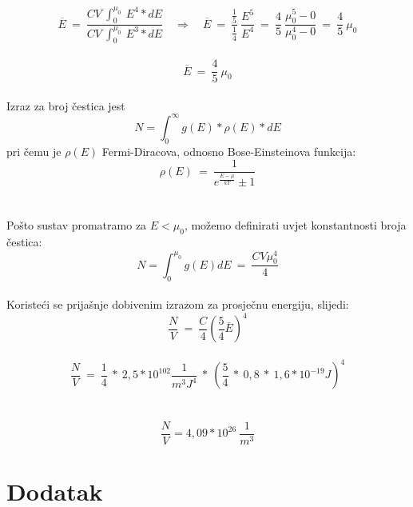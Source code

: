 \documentclass[a4paper,12pt]{article}
\begin{document}
\newpage
$$ \overline{E}\ =\ \frac{CV\ \int_{0}^{\mu_0}\ E^4*dE}{CV\ \int_{0}^{\mu_0}\ E^3*dE} \quad \Rightarrow \quad \overline{E}\ =\ \frac{\frac{1}{5}}{\frac{1}{4}}\ \frac{E^5}{E^4}
\ =\ \frac{4}{5}\ \frac{\mu_0^5-0}{\mu_0^4-0}\ =\ \frac{4}{5}\ \mu_0 $$
\\
$$ \overline{E}\ =\ \frac{4}{5}\ \mu_0 $$
\\
Izraz za broj \v{c}estica jest
$$ N = \int_{0}^{\infty}g(E)*\rho(E)*dE $$
pri \v{c}emu je $\rho(E)$ Fermi-Diracova, odnosno Bose-Einsteinova funkcija:
$$ \rho(E)\ =\ \frac{1}{e^{\frac{E-\mu}{kT}} \pm 1} $$
\\
\\
Po\v{s}to sustav promatramo za $E<\mu_0$, mo\v{z}emo definirati uvjet konstantnosti broja \v{c}estica:
\\
$$ N = \int_{0}^{\mu_0}g(E)dE\ =\ \frac{CV \mu_0^{4}}{4} $$
\\
Koriste\'ci se prija\v{s}nje dobivenim izrazom za prosje\v{c}nu energiju, slijedi:
\\
$$ \frac{N}{V}\ =\ \frac{C}{4} \left( \frac{5}{4} \overline{E} \right)^4 $$
\\
$$ \frac{N}{V}\ =\ \frac{1}{4}\ *\ 2,5*10^{102} \frac{1}{m^3 J^4}\ *\ \left( \frac{5}{4}\ *\ 0,8\ *\ 1,6*10^{-19}J \right)^4 $$
\\
\\
$$ \frac{N}{V} = 4,09*10^{26}\ \frac{1}{m^3} $$

\newpage
\section{Dodatak}
\end{document}
